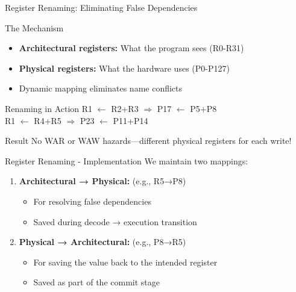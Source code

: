 \documentclass[aspectratio=169,12pt]{beamer}
\begin{document}
\begin{frame}{Register Renaming: Eliminating False Dependencies}
    \begin{block}{The Mechanism}
        \begin{itemize}
            \item \textbf{Architectural registers:} What the program sees (R0-R31)
            \item \textbf{Physical registers:} What the hardware uses (P0-P127)
            \item Dynamic mapping eliminates name conflicts
        \end{itemize}
    \end{block}
    
    \begin{exampleblock}{Renaming in Action}
        {\ttfamily\small
        R1 $\leftarrow$ R2+R3  $\Rightarrow$  P17 $\leftarrow$ P5+P8\\
        R1 $\leftarrow$ R4+R5  $\Rightarrow$  P23 $\leftarrow$ P11+P14
        }
    \end{exampleblock}
    
    \begin{alertblock}{Result}
        No WAR or WAW hazards—different physical registers for each write!
    \end{alertblock}
\end{frame}

\begin{frame}{Register Renaming - Implementation}
    We maintain two mappings:
    
    \begin{enumerate}
        \item \textbf{Architectural → Physical:} (e.g., R5→P8)
        \begin{itemize}
            \item For resolving false dependencies
            \item Saved during decode → execution transition
        \end{itemize}
        
        \item \textbf{Physical → Architectural:} (e.g., P8→R5)
        \begin{itemize}
            \item For saving the value back to the intended register
            \item Saved as part of the commit stage
        \end{itemize}
    \end{enumerate}
\end{frame}
\end{document}
